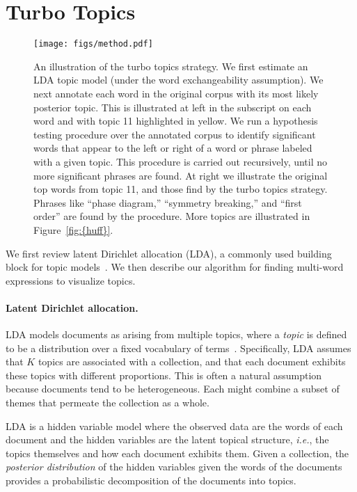 \documentclass[11pt]{article}
\begin{document}
\section{Turbo Topics}
\label{sec:turbotopics}

\begin{figure*}[t]
\begin{center}
  \texttt{[image: figs/method.pdf]}
\end{center}
\caption{\label{fig:method} An illustration of the turbo topics
  strategy.  We first estimate an LDA topic model (under the word
  exchangeability assumption).  We next annotate each word in the
  original corpus with its most likely posterior topic.  This is
  illustrated at left in the subscript on each word and with topic 11
  highlighted in yellow.  We run a hypothesis testing procedure over
  the annotated corpus to identify significant words that appear to
  the left or right of a word or phrase labeled with a given topic.
  This procedure is carried out recursively, until no more significant
  phrases are found.  At right we illustrate the original top words
  from topic 11, and those find by the turbo topics strategy.  Phrases
  like ``phase diagram,'' ``symmetry breaking,'' and ``first order''
  are found by the procedure.  More topics are illustrated in
  {Figure~\ref{fig:{huff}}}.}
\end{figure*}

We first review latent Dirichlet allocation (LDA), a commonly used
building block for topic models~\citep{Blei:2003b}.  We then describe
our algorithm for finding multi-word expressions to visualize topics.

\paragraph{Latent Dirichlet allocation.}  LDA models documents as
arising from multiple topics, where a \textit{topic} is defined to be
a distribution over a fixed vocabulary of terms~\citep{Blei:2003b}.
Specifically, LDA assumes that $K$ topics are associated with a
collection, and that each document exhibits these topics with
different proportions.  This is often a natural assumption because
documents tend to be heterogeneous.  Each might combine a subset of
themes that permeate the collection as a whole.

LDA is a hidden variable model where the observed data are the words
of each document and the hidden variables are the latent topical
structure, {\textit{i.e.}}, the topics themselves and how each document exhibits
them.  Given a collection, the \textit{posterior distribution} of the
hidden variables given the words of the documents provides a
probabilistic decomposition of the documents into topics.
\end{document}
